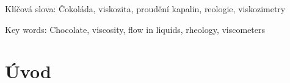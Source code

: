 \documentclass[12pt]{article}
\begin{document}
\par
 \medskip

\par
 \medskip
 Klíčová slova: Čokoláda, viskozita, proudění kapalin, reologie, viskozimetry
 \par
 \medskip
Key words: Chocolate, viscosity, flow in liquids, rheology, viscometers




\newpage


\newpage

\tableofcontents
\newpage

\pagestyle{plain}

\section{Úvod}%
\end{document}

